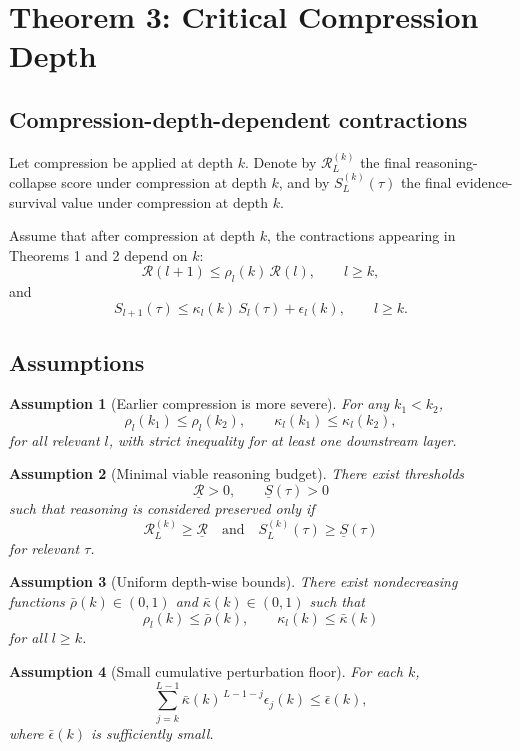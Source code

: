 \documentclass[11pt]{article}
\newtheorem{assumption}{Assumption}
\begin{document}
\section{Theorem 3: Critical Compression Depth}

\subsection{Compression-depth-dependent contractions}

Let compression be applied at depth $k$. Denote by $\mathcal{R}^{(k)}_L$ the final reasoning-collapse score under compression at depth $k$, and by $S_L^{(k)}(\tau)$ the final evidence-survival value under compression at depth $k$.

Assume that after compression at depth $k$, the contractions appearing in Theorems 1 and 2 depend on $k$:
\[
\mathcal{R}(l+1) \le \rho_l(k)\,\mathcal{R}(l),
\qquad l \ge k,
\]
and
\[
S_{l+1}(\tau) \le \kappa_l(k)\,S_l(\tau) + \epsilon_l(k),
\qquad l \ge k.
\]

\subsection{Assumptions}

\begin{assumption}[Earlier compression is more severe]
For any $k_1<k_2$,
\[
\rho_l(k_1) \le \rho_l(k_2),
\qquad
\kappa_l(k_1) \le \kappa_l(k_2),
\]
for all relevant $l$, with strict inequality for at least one downstream layer.
\end{assumption}

\begin{assumption}[Minimal viable reasoning budget]
There exist thresholds
\[
\underline{\mathcal{R}} > 0,
\qquad
\underline{S}(\tau) > 0
\]
such that reasoning is considered preserved only if
\[
\mathcal{R}^{(k)}_L \ge \underline{\mathcal{R}}
\quad \text{and} \quad
S^{(k)}_L(\tau) \ge \underline{S}(\tau)
\]
for relevant $\tau$.
\end{assumption}

\begin{assumption}[Uniform depth-wise bounds]
There exist nondecreasing functions $\bar{\rho}(k)\in(0,1)$ and $\bar{\kappa}(k)\in(0,1)$ such that
\[
\rho_l(k)\le \bar{\rho}(k),
\qquad
\kappa_l(k)\le \bar{\kappa}(k)
\]
for all $l\ge k$.
\end{assumption}

\begin{assumption}[Small cumulative perturbation floor]
For each $k$,
\[
\sum_{j=k}^{L-1}\bar{\kappa}(k)^{\,L-1-j}\epsilon_j(k) \le \bar{\epsilon}(k),
\]
where $\bar{\epsilon}(k)$ is sufficiently small.
\end{assumption}
\end{document}
